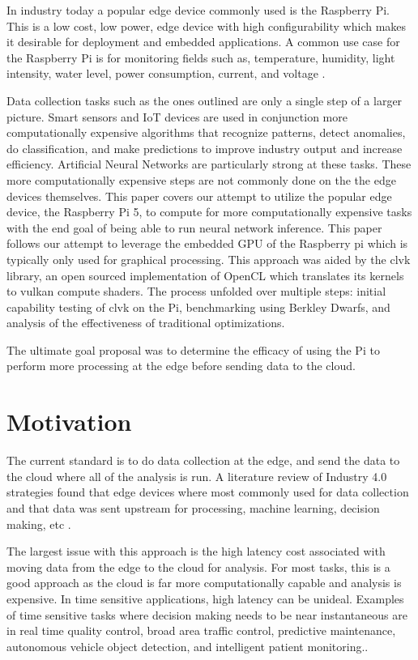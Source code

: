 \documentclass[conference]{IEEEtran}
\begin{document}
 In industry today a popular edge device commonly used is the Raspberry Pi. This is a low cost, 
 low power, edge device with high configurability which makes it desirable for deployment and 
 embedded applications. A common use case for the Raspberry Pi is for monitoring 
 fields such as, temperature, humidity, light intensity, water level, power consumption, current, 
 and voltage \cite{endres_iot_2022,mudaliar_iot_2020,kadiyala_global_2017}. 

 Data collection tasks such as the ones outlined are only a single step of a larger picture.
 Smart sensors and IoT devices are used in conjunction more computationally expensive algorithms that 
 recognize patterns, detect anomalies, do classification, and make predictions 
 to improve industry output  and increase efficiency. Artificial Neural Networks 
 are particularly strong at these tasks. These more computationally expensive steps are not commonly 
 done on the the edge devices themselves. This paper covers our attempt to utilize the popular edge device, 
 the Raspberry Pi 5, to compute for more computationally expensive tasks with the end goal 
 of being able to run neural network inference. This paper follows our attempt 
 to leverage the embedded GPU of the Raspberry pi which is typically only used 
 for graphical processing. This approach was aided by the clvk library, an open sourced implementation 
 of OpenCL which translates its kernels to vulkan compute shaders. The process unfolded over 
 multiple steps: initial capability testing of clvk on the Pi, benchmarking using Berkley Dwarfs, 
 and analysis of the effectiveness of traditional optimizations.
 
 The ultimate goal proposal was to determine the efficacy of 
 using the Pi to perform more processing at the edge before sending data to the cloud.

 \section{Motivation}

 The current standard is to do data collection at the edge, and send 
 the data to the cloud where all of the analysis is run. A literature 
 review of Industry 4.0 strategies found that edge devices where most 
 commonly used for data collection and that data was sent upstream 
 for processing, machine learning, decision making, etc \cite{henao-hernandez_control_2019}. 
 
 The largest issue with this approach is the  
 high latency cost associated with moving data from the edge to the cloud 
 for analysis. For most tasks, this is a good approach as the cloud is far 
 more computationally capable and analysis is expensive. In time sensitive 
 applications, high latency can be unideal. Examples of time sensitive tasks where 
 decision making needs to be near instantaneous are in real time quality control,
 broad area traffic control, predictive maintenance, autonomous vehicle object detection, 
 and intelligent patient monitoring\cite{edge_ai}..
\end{document}
